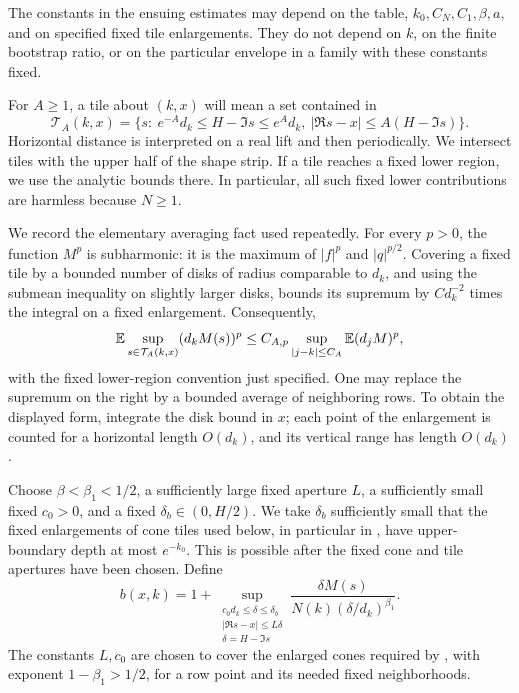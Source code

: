 The constants in the ensuing estimates may depend on the table,
\(k_0,C_N,C_1,\beta,a\), and on specified fixed tile enlargements.
They do not depend on \(k\), on the finite bootstrap ratio, or on the
particular envelope in a family with these constants fixed.

For \(A\ge1\), a tile about \((k,x)\) will mean a set contained in
\begin{equation}\label{critical:eq:tile}
 \mathcal T_A(k,x)=
 \{s:\ e^{-A}d_k\le H-\Im s\le e^Ad_k,
          \ |\Re s-x|\le A(H-\Im s)\}.
\end{equation}
Horizontal distance is interpreted on a real lift and then
periodically. We intersect tiles with the upper half of the shape
strip. If a tile reaches a fixed lower region, we use the analytic
bounds there. In particular, all such fixed lower contributions are
harmless because \(N\ge1\).

We record the elementary averaging fact used repeatedly. For every
\(p>0\), the function \(M^p\) is subharmonic: it is the maximum of
\(|f|^p\) and \(|q|^{p/2}\). Covering a fixed tile by a bounded number
of disks of radius comparable to \(d_k\), and using the submean
inequality on slightly larger disks, bounds its supremum by
\(C d_k^{-2}\) times the integral on a fixed enlargement. Consequently,
\begin{equation}\label{critical:eq:tile-averaging}
 \mathbb E\sup_{s\in\mathcal T_A(k,x)}(d_kM(s))^p
 \le C_{A,p}\sup_{|j-k|\le C_A}\mathbb E(d_jM)^p,
\end{equation}
with the fixed lower-region convention just specified. One may replace
the supremum on the right by a bounded average of neighboring rows.
To obtain the displayed form, integrate the disk bound in \(x\);
each point of the enlargement is counted for a horizontal length
\(O(d_k)\), and its vertical range has length \(O(d_k)\).

Choose
\(\beta<\beta_1<1/2\), a sufficiently large fixed aperture \(L\),
a sufficiently small fixed \(c_0>0\), and a fixed
\(\delta_b\in(0,H/2)\). We take \(\delta_b\) sufficiently small that
the fixed enlargements of cone tiles used below, in particular in
, have upper-boundary depth at most
\(e^{-k_0}\). This is possible after the fixed cone and tile apertures
have been chosen. Define
\begin{equation}\label{critical:eq:cone-cost}
 b(x,k)=1+
 \sup_{\substack{c_0d_k\le\delta\le\delta_b\\
                    |\Re s-x|\le L\delta\\
                    \delta=H-\Im s}}
 \frac{\delta M(s)}{N(k)(\delta/d_k)^{\beta_1}}.
\end{equation}
The constants \(L,c_0\) are chosen to cover the enlarged cones required
by , with exponent \(1-\beta_1>1/2\), for a row point
and its needed fixed neighborhoods.

